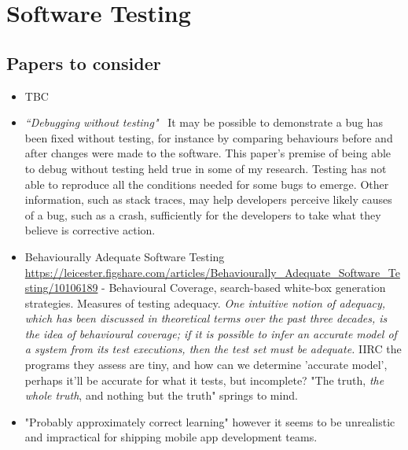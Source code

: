 \section{Software Testing}

\subsection{Papers to consider}
\begin{itemize}
    \item TBC
    \item \emph{``Debugging without testing"}~\cite{ghardallou2016debugging_without_testing} It may be possible to demonstrate a bug has been fixed without testing, for instance by comparing behaviours before and after changes were made to the software. This paper's premise of being able to debug without testing held true in some of my research. Testing has not able to reproduce all the conditions needed for some bugs to emerge. Other information, such as stack traces, may help developers perceive likely causes of a bug, such as a crash, sufficiently for the developers to take what they believe is corrective action.  
    \item Behaviourally Adequate Software Testing \url{https://leicester.figshare.com/articles/Behaviourally_Adequate_Software_Testing/10106189} - Behavioural Coverage, search-based white-box generation strategies. Measures of testing adequacy. \emph{One intuitive notion of adequacy, which has been discussed in theoretical terms over the past three decades, is the idea of behavioural coverage; if it is possible to infer an accurate model of a system from its test executions, then the test set must be adequate.} IIRC the programs they assess are tiny, and how can we determine 'accurate model', perhaps it'll be accurate for what it tests, but incomplete? "The truth, \emph{the whole truth}, and nothing but the truth" springs to mind. %
    \item "Probably approximately correct learning" however it seems to be unrealistic and impractical for shipping mobile app development teams.
\end{itemize}


